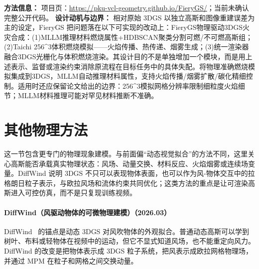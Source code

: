 \textbf{方法信息：} 项目页：\url{https://pku-vcl-geometry.github.io/FieryGS/}；当前未确认完整公开代码。
\textbf{设计动机与边界：} 相对原始 3DGS 以独立高斯和图像重建误差为主的设定，FieryGS 把问题落在以下可实现的改动上：FieryGS物理驱动3DGS火灾合成：(1)MLLM推理材料燃烧属性+HDBSCAN聚类分割可燃/不可燃高斯组；(2)Taichi 256\^{}3体积燃烧模拟——火焰传播、热传递、烟雾生成；(3)统一渲染器融合3DGS光栅化与体积燃烧渲染。其设计目的不是单独增加一个模块，而是用上述表示、监督或渲染约束消除原流程在目标任务中的具体失配。将物理准确燃烧模拟集成到3DGS，MLLM自动推理材料属性，支持火焰传播/烟雾扩散/碳化精细控制。适用时还应保留论文给出的边界：256\^{}3模拟网格分辨率限制细粒度火焰细节；MLLM材料推理可能对罕见材料推断不准确。

\section{其他物理方法}

这一节包含更专门的物理现象建模。与前面偏“动态视觉拟合”的方法不同，这里关心高斯能否承载真实物理状态：风场、动量交换、材料反应、火焰烟雾或连续场变量。DiffWind 说明 3DGS 不只可以表现物体表面，也可以作为风-物体交互中的拉格朗日粒子表示，与欧拉风场和流体约束共同优化；这类方法的重点是让可渲染高斯进入可控仿真，而不是只复现训练视频。
\paragraph{DiffWind（风驱动物体的可微物理建模）（2026.03）}
DiffWind~\cite{2603_09668} 的锚点是动态 3DGS 对风吹物体的外观拟合。普通动态高斯可以学到树叶、布料或轻物体在视频中的运动，但它不显式知道风场，也不能重定向风力。DiffWind 的改变是把物体表示成 3DGS 粒子系统，把风表示成欧拉网格物理场，并通过 MPM 在粒子和网格之间交换动量。

